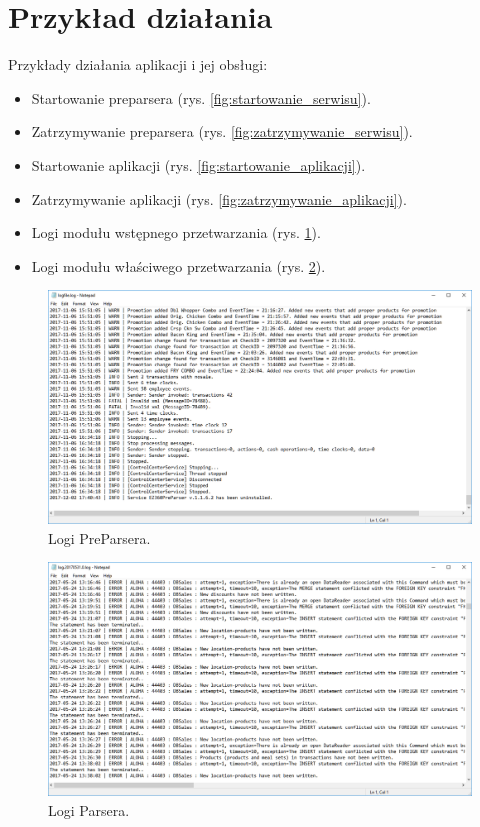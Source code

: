 \documentclass[a4paper]{book}
\begin{document}
\section{Przykład działania}
Przykłady działania aplikacji i jej obsługi:
 \begin{itemize}
	\item Startowanie preparsera (rys. \ref{fig:startowanie_serwisu}).
	\item Zatrzymywanie preparsera (rys. \ref{fig:zatrzymywanie_serwisu}).
	\item Startowanie aplikacji (rys. \ref{fig:startowanie_aplikacji}).
	\item Zatrzymywanie aplikacji (rys. \ref{fig:zatrzymywanie_aplikacji}).
	\item Logi modułu wstępnego przetwarzania (rys. \ref{fig:preparser_log}).
	\item Logi modułu właściwego przetwarzania (rys. \ref{fig:parser_log}).
\end{itemize}
\begin{figure}[t]
	\centering
	\includegraphics{./img/preparser_log.png}
	\caption{Logi PreParsera.}
	\label{fig:preparser_log}
\end{figure}
\begin{figure}[t]
	\centering
	\includegraphics{./img/parser_log.png}
	\caption{Logi Parsera.}
	\label{fig:parser_log}
\end{figure}
\end{document}
